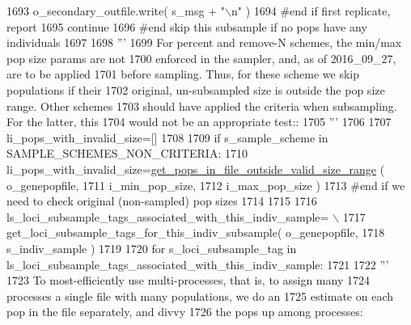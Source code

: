 \begin{DoxyCode}
1693                 o\_secondary\_outfile.write( s\_msg + \textcolor{stringliteral}{"\(\backslash\)n"} )
1694             \textcolor{comment}{#end if first replicate, report}
1695             \textcolor{keywordflow}{continue}
1696         \textcolor{comment}{#end skip this subsample if no pops have any individuals}
1697 
1698         \textcolor{stringliteral}{'''}
1699 \textcolor{stringliteral}{        For percent and remove-N schemes, the min/max pop size params are not }
1700 \textcolor{stringliteral}{        enforced in the sampler, and, as of 2016\_09\_27, are to be applied}
1701 \textcolor{stringliteral}{        before sampling.  Thus, for these scheme we skip populations if their }
1702 \textcolor{stringliteral}{        original, un-subsampled size is outside the pop size range.  Other schemes}
1703 \textcolor{stringliteral}{        should have applied the criteria when subsampling.  For the latter, this}
1704 \textcolor{stringliteral}{        would not be an appropriate test::}
1705 \textcolor{stringliteral}{        '''}
1706 
1707         li\_pops\_with\_invalid\_size=[]
1708         
1709         \textcolor{keywordflow}{if} s\_sample\_scheme \textcolor{keywordflow}{in} SAMPLE\_SCHEMES\_NON\_CRITERIA:
1710             li\_pops\_with\_invalid\_size=\hyperlink{namespacenegui_1_1pgdriveneestimator_ab546af99f06d3ec795da61f806ffafa9}{get\_pops\_in\_file\_outside\_valid\_size\_range}
      ( o\_genepopfile, 
1711                                                                                 i\_min\_pop\_size,
1712                                                                                 i\_max\_pop\_size )
1713         \textcolor{comment}{#end if we need to check original (non-sampled) pop sizes}
1714 
1715 
1716         ls\_loci\_subsample\_tags\_associated\_with\_this\_indiv\_sample= \(\backslash\)
1717                 get\_loci\_subsample\_tags\_for\_this\_indiv\_subsample( o\_genepopfile,
1718                                                                     s\_indiv\_sample )
1719 
1720         \textcolor{keywordflow}{for} s\_loci\_subsample\_tag \textcolor{keywordflow}{in} ls\_loci\_subsample\_tags\_associated\_with\_this\_indiv\_sample:
1721 
1722             \textcolor{stringliteral}{'''}
1723 \textcolor{stringliteral}{            To most-efficiently use multi-processes, that is, to assign many}
1724 \textcolor{stringliteral}{            processes a single file with many populations, we do an}
1725 \textcolor{stringliteral}{            estimate on each pop in the file separately, and divvy}
1726 \textcolor{stringliteral}{            the pops up among processes:}

\end{DoxyCode}

